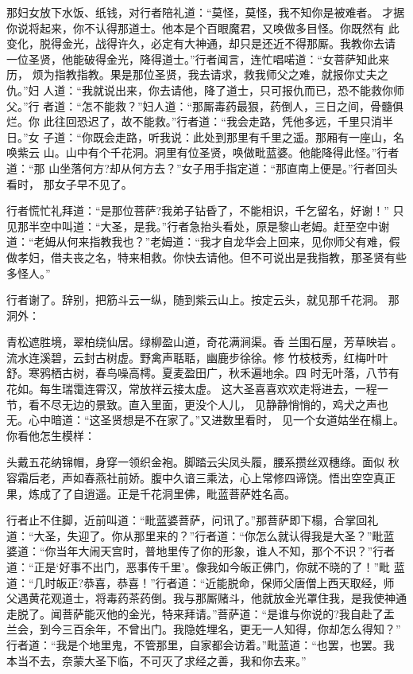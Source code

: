 那妇女放下水饭、纸钱，对行者陪礼道：“莫怪，莫怪，我不知你是被难者。
才据你说将起来，你不认得那道士。他本是个百眼魔君，又唤做多目怪。你既然有
此变化，脱得金光，战得许久，必定有大神通，却只是还近不得那厮。我教你去请
一位圣贤，他能破得金光，降得道士。”行者闻言，连忙唱喏道：“女菩萨知此来历，
烦为指教指教。果是那位圣贤，我去请求，救我师父之难，就报你丈夫之仇。”妇
人道：“我就说出来，你去请他，降了道士，只可报仇而已，恐不能救你师父。”行
者道：“怎不能救？”妇人道：“那厮毒药最狠，药倒人，三日之间，骨髓俱烂。你
此往回恐迟了，故不能救。”行者道：“我会走路，凭他多远，千里只消半日。”女
子道：“你既会走路，听我说：此处到那里有千里之遥。那厢有一座山，名唤紫云
山。山中有个千花洞。洞里有位圣贤，唤做毗蓝婆。他能降得此怪。”行者道：“那
山坐落何方?却从何方去？”女子用手指定道：“那直南上便是。”行者回头看时，
那女子早不见了。

行者慌忙礼拜道：“是那位菩萨?我弟子钻昏了，不能相识，千乞留名，好谢！”
只见那半空中叫道：“大圣，是我。”行者急抬头看处，原是黎山老姆。赶至空中谢
道：“老姆从何来指教我也？”老姆道：“我才自龙华会上回来，见你师父有难，假
做孝妇，借夫丧之名，特来相救。你快去请他。但不可说出是我指教，那圣贤有些
多怪人。”

行者谢了。辞别，把筋斗云一纵，随到紫云山上。按定云头，就见那千花洞。
那洞外：

青松遮胜境，翠柏绕仙居。绿柳盈山道，奇花满涧渠。香
兰围石屋，芳草映岩。流水连溪碧，云封古树虚。野禽声聒聒，幽鹿步徐徐。修
竹枝枝秀，红梅叶叶舒。寒鸦栖古树，春鸟噪高樗。夏麦盈田广，秋禾遍地余。四
时无叶落，八节有花如。每生瑞霭连霄汉，常放祥云接太虚。
这大圣喜喜欢欢走将进去，一程一节，看不尽无边的景致。直入里面，更没个人儿，
见静静悄悄的，鸡犬之声也无。心中暗道：“这圣贤想是不在家了。”又进数里看时，
见一个女道姑坐在榻上。你看他怎生模样：

头戴五花纳锦帽，身穿一领织金袍。脚踏云尖凤头履，腰系攒丝双穗绦。面似
秋容霜后老，声如春燕社前娇。腹中久谙三乘法，心上常修四谛饶。悟出空空真正
果，炼成了了自逍遥。正是千花洞里佛，毗蓝菩萨姓名高。

行者止不住脚，近前叫道：“毗蓝婆菩萨，问讯了。”那菩萨即下榻，合掌回礼
道：“大圣，失迎了。你从那里来的？”行者道：“你怎么就认得我是大圣？”毗蓝
婆道：“你当年大闹天宫时，普地里传了你的形象，谁人不知，那个不识？”行者
道：“正是‘好事不出门，恶事传千里’。像我如今皈正佛门，你就不晓的了！”毗
蓝道：“几时皈正?恭喜，恭喜！”行者道：“近能脱命，保师父唐僧上西天取经，师
父遇黄花观道士，将毒药茶药倒。我与那厮赌斗，他就放金光罩住我，是我使神通
走脱了。闻菩萨能灭他的金光，特来拜请。”菩萨道：“是谁与你说的?我自赴了盂
兰会，到今三百余年，不曾出门。我隐姓埋名，更无一人知得，你却怎么得知？”
行者道：“我是个地里鬼，不管那里，自家都会访着。”毗蓝道：“也罢，也罢。我
本当不去，奈蒙大圣下临，不可灭了求经之善，我和你去来。”

